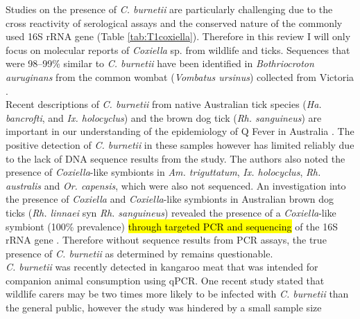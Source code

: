 \documentclass[a4paper, nobind]{templates/ociamthesis}
\begin{document}
Studies on the presence of \emph{C. burnetii} are particularly challenging due to the cross reactivity of serological assays and the conserved nature of the commonly used 16S rRNA gene (Table \ref{tab:T1coxiella}).
Therefore in this review I will only focus on molecular reports of \emph{Coxiella} sp. from wildlife and ticks.
Sequences that were 98--99\% similar to \emph{C. burnetii} have been identified in
\emph{Bothriocroton auruginans} from the common wombat (\emph{Vombatus ursinus}) collected from Victoria \autocite{vilcinsMolecularDetectionRickettsia2009,beardMorphologicalIdentificationTicks2021}.\\
Recent descriptions of \emph{C. burnetii} from native Australian tick species (\emph{Ha. bancrofti}, and \emph{Ix. holocyclus}) and the brown dog tick (\emph{Rh. sanguineus}) are important in our understanding of the epidemiology of Q Fever in Australia \autocite{chaladaMolecularSurveyTickBorne2018}.
The positive detection of \emph{C. burnetii} in these samples however has limited reliably due to the lack of DNA sequence results from the study.
The authors also noted the presence of \emph{Coxiella}-like symbionts in \emph{Am. triguttatum}, \emph{Ix. holocyclus}, \emph{Rh. australis} and \emph{Or. capensis}, which were also not sequenced.
An investigation into the presence of \emph{Coxiella} and \emph{Coxiella}-like symbionts in Australian brown dog ticks (\emph{Rh. linnaei} syn \emph{Rh. sanguineus}) revealed the presence of a \emph{Coxiella}-like symbiont (100\% prevalence) \hl{through targeted PCR and sequencing} of the 16S rRNA gene \autocite{oskamMolecularInvestigationPresence2017}.
Therefore without sequence results from PCR assays, the true presence of \emph{C. burnetii} as determined by \textcite{chaladaMolecularSurveyTickBorne2018} remains questionable.\\
\emph{C. burnetii} was recently detected in kangaroo meat that was intended for companion animal consumption \autocite{shapiroMolecularDetectionCoxiella2020} using qPCR.
One recent study stated that wildlife carers may be two times more likely to be infected with \emph{C. burnetii} than the general public, however the study was hindered by a small sample size \autocite{mathewsCoxiellaBurnetiiSeroprevalence2021}
\end{document}
